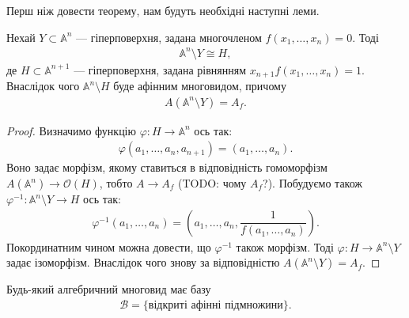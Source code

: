 \documentclass{math_library}
\begin{document}
Перш ніж довести теорему, нам будуть необхідні наступні леми.

\begin{lemma}
Нехай $Y \subset \mathbb{A}^n$ --- гіперповерхня, задана многочленом $f(x_1,\dots,x_n) = 0$. Тоді
\begin{align*}
\mathbb{A}^n \setminus Y \cong H,
\end{align*}
де $H \subset \mathbb{A}^{n+1}$ --- гіперповерхня, задана рівнянням $x_{n+1} f(x_1,\dots,x_n) = 1$. Внаслідок чого $\mathbb{A}^n \setminus H$ буде афінним многовидом, причому
\begin{align*}
A(\mathbb{A}^n \setminus Y) = A_f.
\end{align*}
\end{lemma}

\begin{proof}
Визначимо функцію $\varphi \colon H \to \mathbb{A}^n$ ось так:
\begin{align*}
\varphi(a_1,\dots,a_n,a_{n+1}) = (a_1,\dots,a_n).
\end{align*}
Воно задає морфізм, якому ставиться в відповідність гомоморфізм $A(\mathbb{A}^n) \to \mathcal{O}(H)$, тобто $A \to A_f$ (TODO: чому $A_f$?). Побудуємо також $\varphi^{-1} \colon \mathbb{A}^n \setminus Y \to H$ ось так:
\begin{align*}
\varphi^{-1}(a_1,\dots,a_n) = \left( a_1,\dots,a_n, \dfrac{1}{f(a_1,\dots,a_n)} \right).
\end{align*}
Покординатним чином можна довести, що $\varphi^{-1}$ також морфізм. Тоді $\varphi \colon H \to \mathbb{A}^n \setminus Y$ задає ізоморфізм. Внаслідок чого знову за відповідністю $A(\mathbb{A}^n \setminus Y) = A_f$. 
\end{proof}

\begin{proposition}
Будь-який алгебричний многовид має базу
\begin{align*}
\mathcal{B} = \{ \text{відкриті афінні підмножини} \}.
\end{align*}
\end{proposition}
\end{document}

